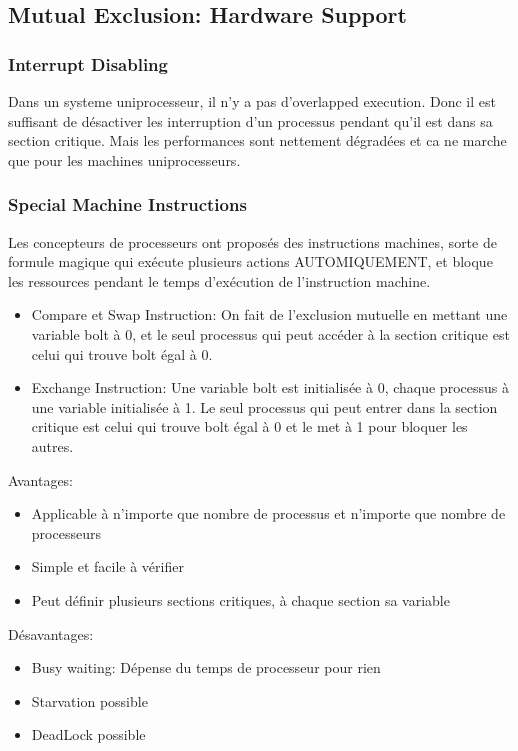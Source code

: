 \subsection{Mutual Exclusion: Hardware Support}
\subsubsection{Interrupt Disabling}
Dans un systeme uniprocesseur, il n'y a pas d'overlapped execution.
Donc il est suffisant de désactiver les interruption d'un processus pendant qu'il est dans sa section critique.
Mais les performances sont nettement dégradées et ca ne marche que pour les machines uniprocesseurs.

\subsubsection{Special Machine Instructions}
Les concepteurs de processeurs ont proposés des instructions machines, sorte de formule magique qui exécute plusieurs actions AUTOMIQUEMENT, et bloque les ressources pendant le temps d'exécution de l'instruction machine.
\begin{itemize}
  \item Compare et Swap Instruction:
    On fait de l'exclusion mutuelle en mettant une variable bolt à 0,
    et le seul processus qui peut accéder à la section critique est celui qui trouve bolt égal à 0.
  \item Exchange Instruction: Une variable bolt est initialisée à 0, chaque processus à une variable initialisée à 1.
    Le seul processus qui peut entrer dans la section critique est celui qui trouve bolt égal à 0 et le met à 1 pour bloquer les autres.
\end{itemize}
Avantages:
\begin{itemize}
  \item Applicable à n'importe que nombre de processus et n'importe que nombre de processeurs
  \item Simple et facile à vérifier
  \item Peut définir plusieurs sections critiques, à chaque section sa variable
\end{itemize}
Désavantages:
\begin{itemize}
  \item Busy waiting: Dépense du temps de processeur pour rien
  \item Starvation possible
  \item DeadLock possible
\end{itemize}

